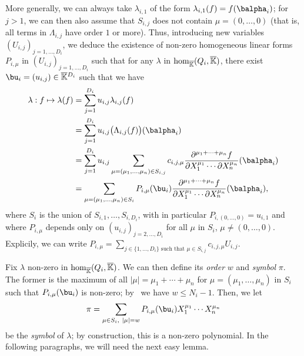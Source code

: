 \documentclass[12pt]{article}
\def\Kbar {{\ensuremath{\overline{\mathbb{K}}}}}
\begin{document}
More generally, we can always take $\lambda_{i,1}$ of the form
$\lambda_{i,1}(f) = f(\balpha_i)$; for $j>1$, we can then also assume
that $S_{i,j}$ does not contain $\mu=(0,\dots,0)$ (that is, all terms
in $\Lambda_{i,j}$ have order $1$ or more). Thus, introducing new
variables $(U_{i,j})_{j =1,\dots,D_i}$, we deduce the existence of
non-zero homogeneous linear forms $P_{i,\mu}$ in
$(U_{i,j})_{j=1,\dots,D_i}$ such that for any $\lambda$ in ${\rm
  hom}_\Kbar(Q_i,\Kbar)$, there exist $\bu_i=(u_{i,j}) \in
\Kbar{}^{D_i}$ such that we have
\begin{align}\label{ell_param}
\lambda: f \mapsto \lambda(f)
  &= \sum_{j=1}^{D_i} u_{i,j} \lambda_{i,j}(f)\nonumber\\
  &= \sum_{j=1}^{D_i} u_{i,j} \big(\Lambda_{i,j}(f)\big)(\balpha_i)\nonumber\\
  &= \sum_{j=1}^{D_i} u_{i,j}
 \sum_{\mu=(\mu_1,\dots,\mu_n) \in
  S_{i,j}} c_{i,j,\mu} \frac{ \partial^{\mu_1 + \cdots + \mu_n} f}
{\partial X_1^{\mu_1} \cdots \partial X_n^{\mu_n}}(\balpha_i)\nonumber\\
&= \sum_{\mu=(\mu_1,\dots,\mu_n) \in S_i} P_{i,\mu}(\bu_i)
 \frac{ \partial^{\mu_1 + \cdots + \mu_n} f}
{\partial X_1^{\mu_1} \cdots \partial X_n^{\mu_n}}(\balpha_i),
\end{align}
 where $S_i$ is  the union of $S_{i,1},\dots,S_{i,D_i}$,
 with in particular $P_{i,(0,\dots,0)}=u_{i,1}$ and where $P_{i,\mu}$
 depends only on $(u_{i,j})_{j =2,\dots,D_i}$ for all $\mu$ in $S_i$,
 $\mu \ne (0,\dots,0)$. Explicily, we can write $P_{i,\mu}=\sum_{j\in
   \{1,\dots,D_i\} \text{~such that~} \mu \in S_{i,j}} c_{i,j,\mu}
 U_{i,j}$.

Fix $\lambda$ non-zero in ${\rm hom}_\Kbar(Q_i,\Kbar)$. We can then
define its {\em order} $w$ and {\em symbol} $\pi$. The former is
the maximum of all $|\mu|=\mu_1+\cdots+\mu_n$ for
$\mu=(\mu_1,\dots,\mu_n)$ in $S_i$ such that $P_{i,\mu}(\bu_i)$ is
non-zero; by~\cite[Lemma~3.3]{Mourrain97} we have $w \le
N_i-1$. Then, we let
$$\pi =\sum_{\mu \in S_i,\ |\mu|=w}P_{i,\mu}(\bu_i) X_1^{\mu_1} \cdots
X_n^{\mu_n}$$ be the {\em symbol} of $\lambda$; by construction,
this is a non-zero polynomial. In the following paragraphs, we will
need the next easy lemma.
\end{document}
